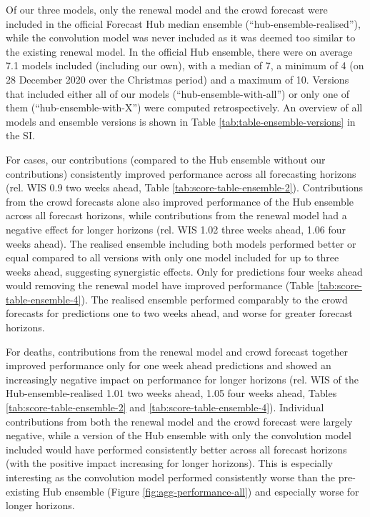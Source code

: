 \documentclass[10pt,letterpaper]{article}
\begin{document}
Of our three models, only the renewal model and the crowd forecast were
included in the official Forecast Hub median ensemble
(``hub-ensemble-realised''), while the convolution model was never
included as it was deemed too similar to the existing renewal model. In
the official Hub ensemble, there were on average 7.1 models included
(including our own), with a median of 7, a minimum of 4 (on 28 December
2020 over the Christmas period) and a maximum of 10. Versions that
included either all of our models (``hub-ensemble-with-all'') or only
one of them (``hub-ensemble-with-X'') were computed retrospectively. An
overview of all models and ensemble versions is shown in Table
\ref{tab:table-ensemble-versions} in the SI.

For cases, our contributions (compared to the Hub ensemble without our
contributions) consistently improved performance across all forecasting
horizons (rel. WIS 0.9 two weeks ahead, Table
\ref{tab:score-table-ensemble-2}). Contributions from the crowd
forecasts alone also improved performance of the Hub ensemble across all
forecast horizons, while contributions from the renewal model had a
negative effect for longer horizons (rel. WIS 1.02 three weeks ahead,
1.06 four weeks ahead). The realised ensemble including both models
performed better or equal compared to all versions with only one model
included for up to three weeks ahead, suggesting synergistic effects.
Only for predictions four weeks ahead would removing the renewal model
have improved performance (Table \ref{tab:score-table-ensemble-4}). The
realised ensemble performed comparably to the crowd forecasts for
predictions one to two weeks ahead, and worse for greater forecast
horizons.

For deaths, contributions from the renewal model and crowd forecast
together improved performance only for one week ahead predictions and
showed an increasingly negative impact on performance for longer
horizons (rel. WIS of the Hub-ensemble-realised 1.01 two weeks ahead,
1.05 four weeks ahead, Tables \ref{tab:score-table-ensemble-2} and
\ref{tab:score-table-ensemble-4}). Individual contributions from both
the renewal model and the crowd forecast were largely negative, while a
version of the Hub ensemble with only the convolution model included
would have performed consistently better across all forecast horizons
(with the positive impact increasing for longer horizons). This is
especially interesting as the convolution model performed consistently
worse than the pre-existing Hub ensemble (Figure
\ref{fig:agg-performance-all}) and especially worse for longer horizons.
\end{document}
